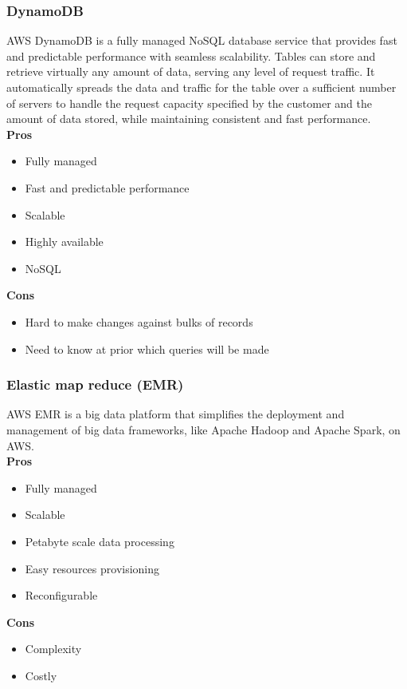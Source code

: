         \subsubsection{DynamoDB}
        \label{aws:dynamodb}
        AWS DynamoDB is a fully managed NoSQL database service that provides fast and predictable performance with seamless scalability.
        Tables can store and retrieve virtually any amount of data, serving any level of request traffic.
        It automatically spreads the data and traffic for the table over a sufficient number of servers to handle the request capacity specified by the customer and the amount of data stored, while maintaining consistent and fast performance.\\
        \textbf{Pros}
        \begin{itemize}
            \item Fully managed
            \item Fast and predictable performance
            \item Scalable
            \item Highly available
            \item NoSQL
        \end{itemize}
        \textbf{Cons}
        \begin{itemize}
            \item Hard to make changes against bulks of records
            \item Need to know at prior which queries will be made
        \end{itemize}

        \subsubsection{Elastic map reduce (EMR)}
        \label{aws:emr}
        AWS EMR is a big data platform that simplifies the deployment and management of big data frameworks, like Apache Hadoop and Apache Spark, on AWS.\\
        \textbf{Pros}
        \begin{itemize}
            \item Fully managed
            \item Scalable
            \item Petabyte scale data processing
            \item Easy resources provisioning
            \item Reconfigurable
        \end{itemize}
        \textbf{Cons}
        \begin{itemize}
            \item Complexity
            \item Costly
        \end{itemize}

